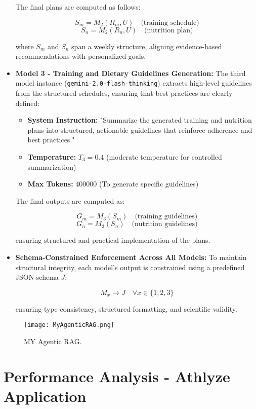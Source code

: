 \documentclass[conference]{IEEEtran}
\begin{document}
\begin{itemize}
    The final plans are computed as follows:

    \[
    S_m = M_2(R_m, U) \quad \text{(training schedule)}
    \]
    \[
    S_n = M_2(R_n, U) \quad \text{(nutrition plan)}
    \]

    where $S_m$ and $S_n$ span a weekly structure, aligning evidence-based recommendations with personalized goals.

    \item \textbf{Model 3 - Training and Dietary Guidelines Generation:}  
    The third model instance (\texttt{gemini-2.0-flash-thinking}) extracts high-level guidelines from the structured schedules, ensuring that best practices are clearly defined:

    \begin{itemize}
        \item \textbf{System Instruction:} "Summarize the generated training and nutrition plans into structured, actionable guidelines that reinforce adherence and best practices."
        \item \textbf{Temperature:} $T_3 = 0.4$ (moderate temperature for controlled summarization)
        \item \textbf{Max Tokens:} 400000 (To generate specific guidelines)
    \end{itemize}

    The final outputs are computed as:

    \[
    G_m = M_3(S_m) \quad \text{(training guidelines)}
    \]
    \[
    G_n = M_3(S_n) \quad \text{(nutrition guidelines)}
    \]

    ensuring structured and practical implementation of the plans.

    \item \textbf{Schema-Constrained Enforcement Across All Models:}  
    To maintain structural integrity, each model's output is constrained using a predefined JSON schema $J$:

    \[
    M_x \rightarrow J \quad \forall x \in \{1, 2, 3\}
    \]

    ensuring type consistency, structured formatting, and scientific validity.
\end{itemize}

\begin{figure}[h!]
    \centering
    \texttt{[image: MyAgenticRAG.png]}
    \caption{MY Agentic RAG.}
    \label{fig:RAG}
\end{figure}

\section{Performance Analysis - Athlyze Application}
\end{document}
